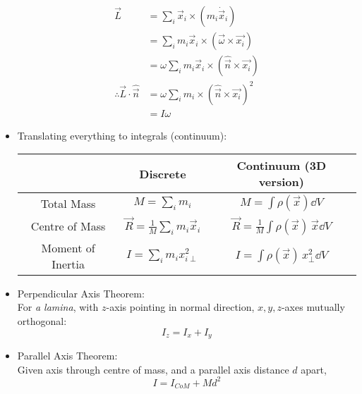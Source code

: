 \begin{itemize}
            \begin{align*}
                  \vec{L}                                & = \sum_i \vec{x}_i \times (m_i \dot{\vec{x}}_i)                       \\
                                                         & = \sum_i m_i \vec{x}_i \times (\vec{\omega} \times \vec{x_i})         \\
                                                         & = \omega \sum_i m_i \vec{x}_i \times (\hat{\vec{n}} \times \vec{x_i}) \\
                  \therefore \vec{L} \cdot \hat{\vec{n}} & = \omega \sum_i m_i \times (\hat{\vec{n}} \times \vec{x_i})^2         \\
                                                         & = I \omega
            \end{align*}
      \item Translating everything to integrals (continuum):
            \begin{center}
                  \renewcommand{\arraystretch}{1.5}
                  \begin{tabular}{|c|c|c|}
                        \hline
                                          & Discrete                                     & Continuum (3D version)                                       \\
                        \hline
                        Total Mass        & $M = \sum_i m_i$                             & $M = \int \rho(\vec{x}) \dd V$                               \\
                        \hline
                        Centre of Mass    & $\vec{R} = \frac{1}{M} \sum_i m_i \vec{x}_i$ & $\vec{R} = \frac{1}{M} \int  \rho(\vec{x}) \, \vec{x} \dd V$ \\
                        \hline
                        Moment of Inertia & $I = \sum_i m_i x_{i\perp}^2 $               & $I = \int \rho (\vec{x}) \, x_{\perp}^2\dd V$                \\
                        \hline
                  \end{tabular}
            \end{center}
      \item Perpendicular Axis Theorem: \\ For \emph{a lamina}, with $z$-axis pointing in normal direction, $x,y,z$-axes mutually orthogonal: \[I_z = I_x + I_y\]
      \item Parallel Axis Theorem: \\
            Given axis through centre of mass, and a parallel axis distance $d$ apart,
            \[I = I_{CoM} + Md^2\]


\end{itemize}

